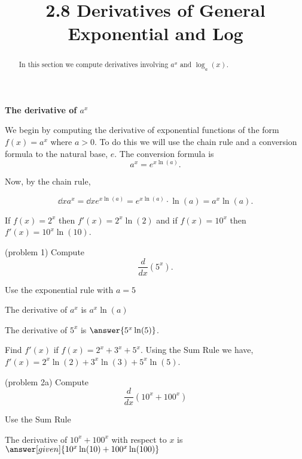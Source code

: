 \documentclass{ximera}
\title{2.8 Derivatives of General Exponential and Log}
\begin{document}
\begin{abstract}
In this section we compute derivatives involving $a^x$ and $\log_a(x)$.
\end{abstract}

\maketitle




\begin{center}
\textbf{The derivative of $a^x$}
\end{center}


We begin by computing the derivative of exponential functions of the form  $f(x) = a^x$ where $a > 0$. 
To do this we will use the chain rule and a conversion formula to the natural base, $e$.
The conversion formula is 
\[
a^x = e^{x\ln(a)}.
\]

Now, by the chain rule,

\[
\dd{x} a^x = \dd{x} e^{x\ln(a)}  = e^{x\ln(a)}\cdot \ln(a) = a^x \ln(a).
\]



\begin{example}[example 1]
If $f(x) = 2^x$ then $f'(x) = 2^x \ln(2)$
and if $f(x) = 10^x$ then $f'(x) = 10^x \ln(10)$.
\end{example}



\begin{problem}(problem 1)
Compute
\[
\frac{d}{dx} \left(5^x\right).
\]
\begin{hint}
Use the exponential rule with $a = 5$
\end{hint}
\begin{hint}
The derivative of $a^x$ is $a^x\ln(a)$
\end{hint}
The derivative of $5^x$ is $\answer{5^x\ln(5)}$.
\end{problem}




\begin{example}[example 2]
 Find $f'(x)$ if $f(x) = 2^x + 3^x + 5^x.$
Using the Sum Rule we have, $f'(x) = 2^x\ln(2) + 3^x\ln(3) + 5^x\ln(5)$.
\end{example}


\begin{problem}(problem 2a)
  Compute 
  \[
  \frac{d}{dx} \left(10^x + 100^x\right)
  \]
  
    \begin{hint}
      Use the Sum Rule
    \end{hint}    
		The derivative of $10^x + 100^x$ with respect to $x$ is
		 $\answer[given]{10^x \ln(10) + 100^x \ln(100)}$
	
\end{problem}
\end{document}
